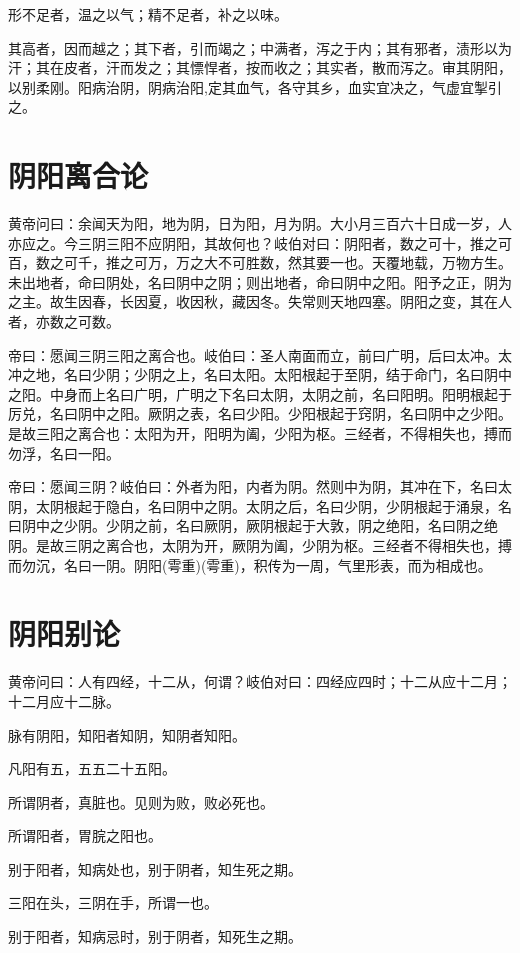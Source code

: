 \documentclass{article}%
\begin{document}
形不足者，温之以气；精不足者，补之以味。

其高者，因而越之；其下者，引而竭之；中满者，泻之于内；其有邪者，渍形以为汗；其在皮者，汗而发之；其慓悍者，按而收之；其实者，散而泻之。审其阴阳，以别柔刚。阳病治阴，阴病治阳,定其血气，各守其乡，血实宜决之，气虚宜掣引之。


\section{阴阳离合论}
黄帝问曰：余闻天为阳，地为阴，日为阳，月为阴。大小月三百六十日成一岁，人亦应之。今三阴三阳不应阴阳，其故何也？岐伯对曰：阴阳者，数之可十，推之可百，数之可千，推之可万，万之大不可胜数，然其要一也。天覆地载，万物方生。未出地者，命曰阴处，名曰阴中之阴；则出地者，命曰阴中之阳。阳予之正，阴为之主。故生因春，长因夏，收因秋，藏因冬。失常则天地四塞。阴阳之变，其在人者，亦数之可数。

帝曰：愿闻三阴三阳之离合也。岐伯曰：圣人南面而立，前曰广明，后曰太冲。太冲之地，名曰少阴；少阴之上，名曰太阳。太阳根起于至阴，结于命门，名曰阴中之阳。中身而上名曰广明，广明之下名曰太阴，太阴之前，名曰阳明。阳明根起于厉兑，名曰阴中之阳。厥阴之表，名曰少阳。少阳根起于窍阴，名曰阴中之少阳。是故三阳之离合也：太阳为开，阳明为阖，少阳为枢。三经者，不得相失也，搏而勿浮，名曰一阳。

帝曰：愿闻三阴？岐伯曰：外者为阳，内者为阴。然则中为阴，其冲在下，名曰太阴，太阴根起于隐白，名曰阴中之阴。太阴之后，名曰少阴，少阴根起于涌泉，名曰阴中之少阴。少阴之前，名曰厥阴，厥阴根起于大敦，阴之绝阳，名曰阴之绝阴。是故三阴之离合也，太阴为开，厥阴为阖，少阴为枢。三经者不得相失也，搏而勿沉，名曰一阴。阴阳(雩重)(雩重)，积传为一周，气里形表，而为相成也。


\section{阴阳别论}
黄帝问曰：人有四经，十二从，何谓？岐伯对曰：四经应四时；十二从应十二月；十二月应十二脉。

脉有阴阳，知阳者知阴，知阴者知阳。

凡阳有五，五五二十五阳。

所谓阴者，真脏也。见则为败，败必死也。

所谓阳者，胃脘之阳也。

别于阳者，知病处也，别于阴者，知生死之期。

三阳在头，三阴在手，所谓一也。

别于阳者，知病忌时，别于阴者，知死生之期。
\end{document}
